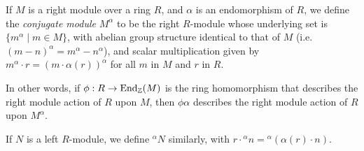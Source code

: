 \documentclass{article}
\begin{document}
If $M$ is a right module over a ring $R$,
and $\alpha$ is an endomorphism of $R$,
we define the {\it conjugate module} $M^\alpha$ 
to be the right $R$-module
whose underlying set is $\{ m^\alpha \mid m \in M \}$,
with abelian group structure identical to that of $M$
(i.e. $(m-n)^\alpha = m^\alpha - n^\alpha$),
and scalar multiplication given by
${m^\alpha} \cdot r = (m \cdot \alpha(r))^\alpha$
for all $m$ in $M$ and $r$ in $R$. 

In other words, if $\phi: R \to {\rm End}_{\Bbb Z}(M)$
is the ring homomorphism that describes 
the right module action of $R$ upon $M$,
then $\phi \alpha$ describes
the right module action of $R$ upon $M^\alpha$.


If $N$ is a left $R$-module, we define ${^\alpha N}$ similarly,
with $r \cdot {^\alpha n} = {^\alpha(\alpha(r) \cdot n)}$.
\end{document}
